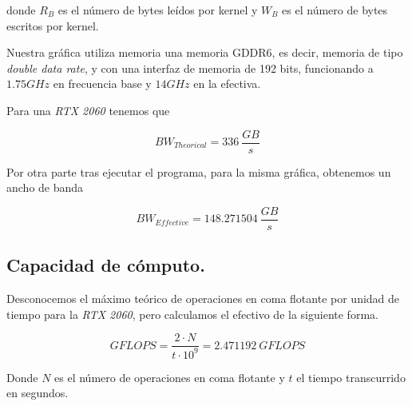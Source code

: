 donde $R_{B}$ es el número de bytes leídos por kernel y $W_{B}$ es el número de bytes
escritos por kernel.

\pagebreak

Nuestra gráfica utiliza memoria una memoria GDDR6, es decir, memoria de tipo \textit{double data rate},
y con una interfaz de memoria de 192 bits, funcionando a $1.75GHz$ en frecuencia base y $14GHz$ en la efectiva.

Para una \textit{RTX 2060} tenemos que

$$ BW_{Theorical} = 336 \ \frac{GB}{s} $$

Por otra parte tras ejecutar el programa, para la misma gráfica, obtenemos un ancho de banda

$$ BW_{Effective} = 148.271504 \ \frac{GB}{s} $$

\subsection{Capacidad de cómputo.}

Desconocemos el máximo teórico de operaciones en coma flotante por unidad de tiempo para la \textit{RTX 2060}, pero calculamos el efectivo de la siguiente forma.

$$ GFLOPS = \frac{2 \cdot N}{t \cdot 10^{9}} = 2.471192 \ GFLOPS $$

Donde $N$ es el número de operaciones en coma flotante y $t$ el tiempo transcurrido en segundos.

